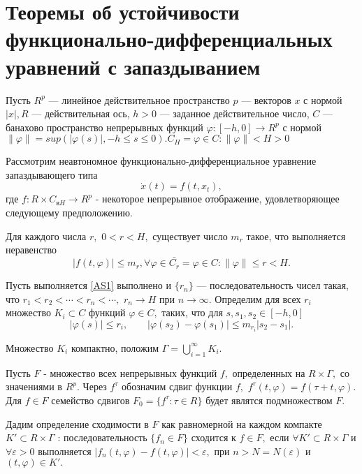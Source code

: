 \section{Теоремы об устойчивости функционально-дифференциальных уравнений с запаздыванием} \label{p11}

	Пусть $R^p$ --- линейное действительное пространство $p$ --- векторов $x$ с нормой $|x|,  R$ 
	--- действительная ось, $h>0$ --- заданное действительное число, $C$ --- банахово пространство
	непрерывных функций $\varphi:[-h,0] \rightarrow R^p$ с нормой $\|\varphi\|=sup(|\varphi(s)|,-h \le s \le 0). C_H = {\varphi \in C : \| \varphi \| < H > 0}$
	
	Рассмотрим неавтономное  функционально-дифференциальное
	уравнение запаздывающего типа
	\begin{equation}
	\dot x(t) = f(t,x_t), \label{1.1'}
	\end{equation}
	где $f: R \times C_{вH}\to R^p$ - некоторое непрерывное отображение,
	удовлетворяющее  следующему предположению.
	
	\begin{definition}\label{AS1} Для  каждого  числа $r,$ $0<r<H,$
		существует число $m_r$ такое, что выполняется неравенство
		\begin{equation}\label{1.2'}
		\left| f(t, \varphi) \right|\le m_r, \forall \varphi \in \bar{C_r} = {\varphi \in C: \| \varphi \| \le r < H}.
		\end{equation}
	\end{definition}
	
	Пусть выполняется \ref{AS1} выполнено и $\{r_n\}$ ---
	последовательность чисел такая, что $r_1<r_2<\cdots <r_n<\cdots, $
	$r_n\to H$ при $n\to \infty .$ Определим для всех $r_i$
	множество $K_i\subset C$ функций $\varphi \in C,$ таких, что
	для $s, s_1,s_2 \in [-h,0]$  $$|\varphi (s)|\le r_i, \qquad
	|\varphi (s_2)-\varphi (s_1)|\le m_{r_i} |s_2-s_1|.$$
	
	Множество $K_i$ компактно, положим $\Gamma =\bigcup\limits_{i=1}^{\infty } {K_i}.$
	
	Пусть $F$ - множество всех непрерывных функций $f,$
	определенных на $R \times \Gamma,$ со значениями в $R^p.$
	Через $f^{\tau }$ обозначим сдвиг функции $f,$ $f^{\tau }(t,\varphi )=f(\tau +t,\varphi ).$
	Для $f\in F$ семейство сдвигов $F_0=\{f^{\tau }:\tau\in
	R\}$ будет являтся подмножеством $F.$
	
	Дадим определение сходимости в $F$ как равномерной на каждом компакте
	$K'\subset R\times \Gamma $ : последовательность
	$\{f_n\in F\}$ сходится к $f\in F,$ если $\forall K'\subset
	R\times\Gamma $ и $\forall \varepsilon >0$ выполняется $|f_n(t,\varphi
	)-f(t,\varphi )|<\varepsilon,$ при $n>N=N(\varepsilon )$ и
	$(t,\varphi )\in K'.$
	

